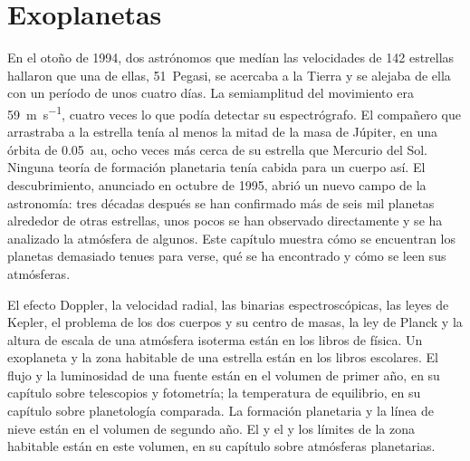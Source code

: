 \chapter{Exoplanetas}\label{ch:b3:exoplanets}

En el otoño de 1994, dos astrónomos que medían las velocidades de 142
estrellas hallaron que una de ellas, 51~Pegasi, se acercaba a la Tierra y se alejaba de ella
con un período de unos cuatro días. La semiamplitud del movimiento era
\qty{59}{m.s^{-1}}, cuatro veces lo que podía detectar su espectrógrafo. El
compañero que arrastraba a la estrella tenía al menos la mitad de la masa de
Júpiter, en una órbita de \qty{0.05}{au}, ocho veces más cerca de su estrella
que Mercurio del Sol. Ninguna teoría de formación planetaria tenía cabida para
un cuerpo así. El descubrimiento, anunciado en octubre de 1995, abrió un nuevo campo
de la astronomía: tres décadas después se han confirmado más de seis mil planetas
alrededor de otras estrellas, unos pocos se han observado directamente y
se ha analizado la atmósfera de algunos. Este capítulo muestra cómo se encuentran los planetas demasiado tenues
para verse, qué se ha encontrado y cómo se leen sus
atmósferas.

\begin{recall}
El efecto Doppler, la velocidad radial, las binarias espectroscópicas, las
leyes de Kepler, el problema de los dos cuerpos y su centro de masas, la ley de
Planck y la altura de escala de una atmósfera isoterma están en los libros de física. Un
exoplaneta y la zona habitable de una estrella están en los libros escolares. El
flujo y la luminosidad de una fuente están en el volumen de primer año, en su
capítulo sobre telescopios y fotometría; la temperatura de equilibrio, en su
capítulo sobre planetología comparada. La formación planetaria y la línea de
nieve están en el volumen de segundo año. El  y el  y los límites de la zona habitable están en este volumen, en su
capítulo sobre atmósferas planetarias.
\end{recall}

